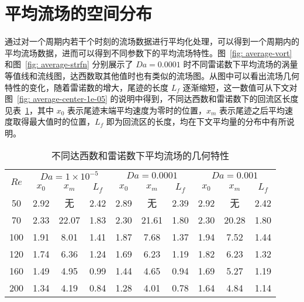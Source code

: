 \clearpage
\section{平均流场的空间分布}\label{sec: average}


通过对一个周期内若干个时刻的流场数据进行平均化处理，可以得到一个周期内的平均流场数据，进而可以得到不同参数下的平均流场特性。图~\ref{fig: average-vort} 和图~\ref{fig: average-strfn} 分别展示了 $Da=0.0001$ 时不同雷诺数下平均流场的涡量等值线和流线图，达西数取其他值时也有类似的流场图。从图中可以看出流场几何特性的变化，随着雷诺数的增大，尾迹的长度 $L_f$ 逐渐缩短，这一数值可从下文对图~\ref{fig: average-center-1e-05} 的说明中得到，不同达西数和雷诺数下的回流区长度见表~\ref{tab: geometry}，其中 $x_0$ 表示尾迹末端平均速度为零时的位置，$x_m$ 表示尾迹之后平均速度取得最大值时的位置，$L_f$ 即为回流区的长度，均在下文平均量的分布中有所说明。

\begin{table}[ht]
	\caption{不同达西数和雷诺数下平均流场的几何特性}\label{tab: geometry}
	\vspace{.5em}\centering\wuhao
	\begin{tabular}{*{10}{c}}
		\toprule[1.5pt]
		\multirow{2}[3]{*}{$Re$} & \multicolumn{3}{c}{$Da=1\times 10^{-5}$} & \multicolumn{3}{c}{$Da=0.0001$} & \multicolumn{3}{c}{$Da=0.001$} \\
		\cmidrule[.67pt](lr){2-4} \cmidrule[.67pt](lr){5-7} \cmidrule[.67pt](lr){8-10}
		& $x_0$ & $x_m$ & $L_f$ & $x_0$ & $x_m$ & $L_f$ & $x_0$ & $x_m$ & $L_f$ \\
		\midrule[1pt]
		50	& 2.92 & 无    & 2.42 & 2.89 & 无    & 2.39 & 2.92 & 无    & 2.42 \\
		70	& 2.33 & 22.07 & 1.83 & 2.30 & 21.61 & 1.80 & 2.30 & 20.28 & 1.80 \\
		100 & 1.91 & 8.01  & 1.41 & 1.87 & 7.68  & 1.37 & 1.94 & 7.52  & 1.44 \\
		120 & 1.74 & 6.36  & 1.24 & 1.69 & 6.23  & 1.19 & 1.82 & 6.23  & 1.32 \\
		160 & 1.49 & 4.95  & 0.99 & 1.44 & 4.65  & 0.94 & 1.69 & 5.27  & 1.19 \\
		200 & 1.34 & 4.19  & 0.84 & 1.28 & 4.01  & 0.78 & 1.64 & 4.84  & 1.14 \\
		\bottomrule[1.5pt]
	\end{tabular}
\end{table}

